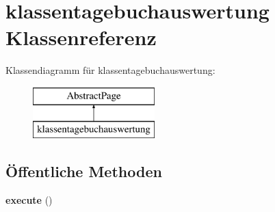 \hypertarget{classklassentagebuchauswertung}{}\section{klassentagebuchauswertung Klassenreferenz}
\label{classklassentagebuchauswertung}
Klassendiagramm für klassentagebuchauswertung\+:\begin{figure}[H]
\begin{center}
\leavevmode
\includegraphics[height=2.000000cm]{classklassentagebuchauswertung}
\end{center}
\end{figure}
\subsection*{Öffentliche Methoden}
\begin{DoxyCompactItemize}
\item 
\mbox{\label{classklassentagebuchauswertung_aa0ed488e609900d5b0203ee4ba0c99d4}} 
{\bfseries execute} ()
\end{DoxyCompactItemize}
